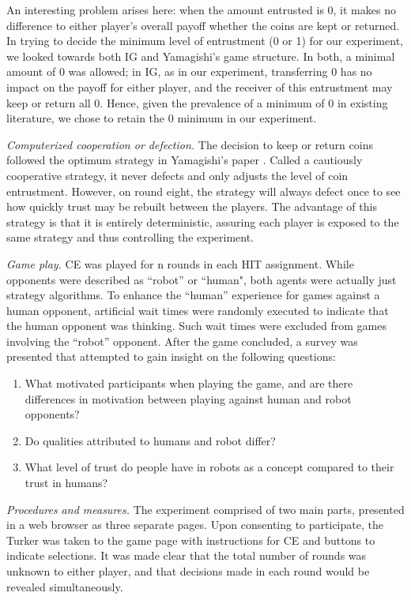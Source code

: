 \documentclass{sig-alternate}
\begin{document}
An interesting problem arises here: when the amount entrusted is 0, it makes no difference to either player's overall payoff whether the coins are kept or returned. In trying to decide the minimum level of entrustment (0 or 1) for our experiment, we looked towards both IG and Yamagishi's game structure. In both, a minimal amount of 0 was allowed; in IG, as in our experiment, transferring 0 has no impact on the payoff for either player, and the receiver of this entrustment may keep or return all 0. Hence, given the prevalence of a minimum of 0 in existing literature, we chose to retain the 0 minimum in our experiment.

\textit{Computerized cooperation or defection. } The decision to keep or return coins followed the optimum strategy in Yamagishi's paper \cite{yamagishi2005separating}. Called a cautiously cooperative strategy, it never defects and only adjusts the level of coin entrustment. However, on round eight, the strategy will always defect once to see how quickly trust may be rebuilt between the players. The advantage of this strategy is that it is entirely deterministic, assuring each player is exposed to the same strategy and thus controlling the experiment.

\textit{Game play. } CE was played for n rounds in each HIT assignment. While opponents were described as ``robot'' or ``human", both agents were actually just strategy algorithms. To enhance the ``human'' experience for games against a human opponent, artificial wait times were randomly executed to indicate that the human opponent was thinking. Such wait times were excluded from games involving the ``robot'' opponent. After the game concluded, a survey was presented that attempted to gain insight on the following questions:

\begin{enumerate}
\item What motivated participants when playing the game, and are there differences in motivation between playing against human and robot opponents? 
\item Do qualities attributed to humans and robot differ? \cite{arras2000we}
\item What level of trust do people have in robots as a concept compared to their trust in humans? \cite{jian2000foundations}
\end{enumerate}

\textit{Procedures and measures. } The experiment comprised of two main parts, presented in a web browser as three separate pages. Upon consenting to participate, the Turker was taken to the game page with instructions for CE and buttons to indicate selections. It was made clear that the total number of rounds was unknown to either player, and that decisions made in each round would be revealed simultaneously. 
\end{document}
